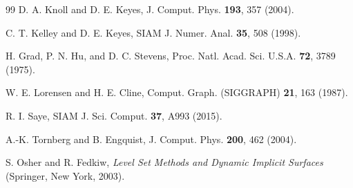 \documentclass[english]{article}
\begin{document}
\begin{thebibliography}{99}
 D. A. Knoll and D. E. Keyes, J. Comput. Phys. {\bf 193}, 357 (2004).

 C. T. Kelley and D. E. Keyes, SIAM J. Numer. Anal. {\bf 35}, 508 (1998).

 H. Grad, P. N. Hu, and D. C. Stevens,
Proc. Natl. Acad. Sci. U.S.A. {\bf 72}, 3789 (1975).

 W. E. Lorensen and H. E. Cline,
Comput. Graph. (SIGGRAPH) {\bf 21}, 163 (1987).

 R. I. Saye, SIAM J. Sci. Comput. {\bf 37}, A993 (2015).

 A.-K. Tornberg and B. Engquist, J. Comput. Phys. {\bf 200}, 462 (2004).

 S. Osher and R. Fedkiw, \emph{Level Set Methods and Dynamic Implicit
Surfaces} (Springer, New York, 2003).

\end{thebibliography}
\end{document}
